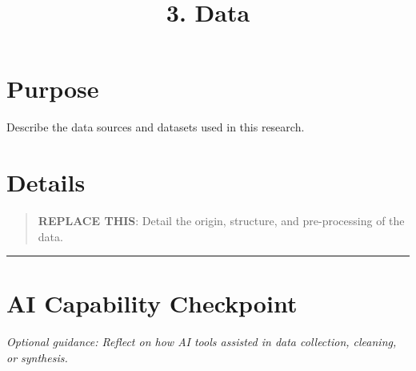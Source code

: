 \documentclass[
]{report}
\title{3. Data}
\author{}
\date{}
\renewcommand*\contentsname{Table of contents}
\newcommand\contentsname{Table of contents}
\begin{document}
\maketitle

\renewcommand*\contentsname{Table of contents}
{
\hypersetup{linkcolor=}
\setcounter{tocdepth}{2}
\tableofcontents
}

\chapter{Purpose}\label{purpose}

Describe the data sources and datasets used in this research.

\chapter{Details}\label{details}

\begin{quote}
\textbf{REPLACE THIS}: Detail the origin, structure, and pre-processing
of the data.
\end{quote}

\begin{center}\rule{0.5\linewidth}{0.5pt}\end{center}

\chapter{AI Capability Checkpoint}\label{ai-capability-checkpoint}

\emph{Optional guidance: Reflect on how AI tools assisted in data
collection, cleaning, or synthesis.}
\end{document}

